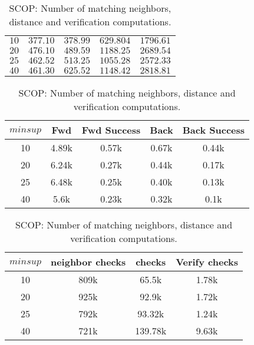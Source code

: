 \begin{table}[!h]
\begin{tabular}{|c|c|c|c|c|}
		\hline
    $10$& $377.10$&$378.99$&$629.804$ & $1796.61$ \\
    $20$& $476.10$&$489.59$&$1188.25$ & $2689.54$\\
    $25$& $462.52$&$513.25$&$1055.28$ & $2572.33$\\
    $40$& $461.30$&$625.52$&$1148.42$ & $2818.81$\\
        \hline
    \end{tabular}
	\vspace{-0.1in}
	\caption{SCOP: Time (sec) for Different Steps vs.\  $minsup$}
\label{tab:scop_minsup}
%
	\vspace{0.1in}
    \centering
    \begin{tabular}{|c|c|c|c|c|}
        \hline
        $minsup$ & Fwd & Fwd Success & Back & Back Success \\
        \hline
10	&4.89k&		0.57k&		0.67k&		0.44k\\ 
20	&6.24k&		0.27k&		0.44k&		0.17k\\
25	&6.48k&		0.25k&		0.40k&		0.13k\\
40	&5.6k &   	0.23k&		0.32k&		0.1k \\ 
        \hline
    \end{tabular}
	\vspace{-0.1in}
    \caption{SCOP: Number of extensions and successes}
    \label{tab:scop_ext}
	\vspace{0.1in}
\centering
\begin{tabular}{|c|c|c|c|}
	\hline
	$minsup$ & neighbor checks & \khop checks & Verify checks \\
	\hline
10&	809k&		65.5k	&	1.78k\\ 
20&	925k&		92.9k	&	1.72k\\
25&	792k&		93.32k	&	1.24k\\
40&	721k&		139.78k	&	9.63k\\
	\hline
	\end{tabular}
	\vspace{-0.1in}
	\caption{SCOP: Number of matching neighbors, \khop distance and verification computations.}
	\label{tab:scop_checks}
\end{table}

